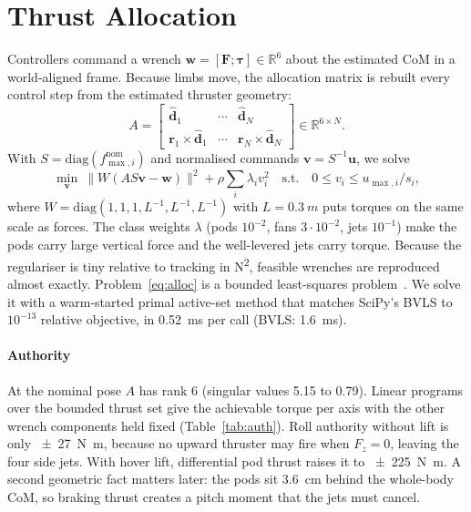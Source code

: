 \documentclass[conference]{IEEEtran}
\newcommand{\vect}[1]{\boldsymbol{#1}}
\begin{document}
\section{Thrust Allocation}
\label{sec:alloc}
Controllers command a wrench $\vect w=[\vect F;\vect\tau]\in\mathbb R^6$ about the estimated CoM in a world-aligned frame. Because limbs move, the allocation matrix is rebuilt every control step from the estimated thruster geometry:
\begin{equation}
A = \begin{bmatrix}\hat{\vect d}_1 & \cdots & \hat{\vect d}_N\\ \vect r_1\times\hat{\vect d}_1 & \cdots & \vect r_N\times\hat{\vect d}_N\end{bmatrix}\in\mathbb R^{6\times N}.
\end{equation}
With $S=\mathrm{diag}(f_{\max,i}^{\text{nom}})$ and normalised commands $\vect v=S^{-1}\vect u$, we solve
\begin{equation}
\min_{\vect v}\ \|W(AS\vect v-\vect w)\|^2+\rho\sum_i\lambda_i v_i^2\quad\text{s.t.}\quad 0\le v_i\le u_{\max,i}/s_i,
\label{eq:alloc}
\end{equation}
where $W=\mathrm{diag}(1,1,1,L^{-1},L^{-1},L^{-1})$ with $L=\SI{0.3}{m}$ puts torques on the same scale as forces. The class weights $\lambda$ (pods $10^{-2}$, fans $3\cdot10^{-2}$, jets $10^{-1}$) make the pods carry large vertical force and the well-levered jets carry torque. Because the regulariser is tiny relative to tracking in \si{N^2}, feasible wrenches are reproduced almost exactly. Problem~\eqref{eq:alloc} is a bounded least-squares problem~\cite{stark1995bvls,johansen2013allocation}. We solve it with a warm-started primal active-set method that matches SciPy's BVLS to $10^{-13}$ relative objective, in \SI{0.52}{ms} per call (BVLS: \SI{1.6}{ms}).

\paragraph*{Authority} At the nominal pose $A$ has rank 6 (singular values 5.15 to 0.79). Linear programs over the bounded thrust set give the achievable torque per axis with the other wrench components held fixed (Table~\ref{tab:auth}). Roll authority without lift is only \SI{\pm27}{N.m}, because no upward thruster may fire when $F_z=0$, leaving the four side jets. With hover lift, differential pod thrust raises it to \SI{\pm225}{N.m}. A second geometric fact matters later: the pods sit \SI{3.6}{cm} behind the whole-body CoM, so braking thrust creates a pitch moment that the jets must cancel.
\end{document}
